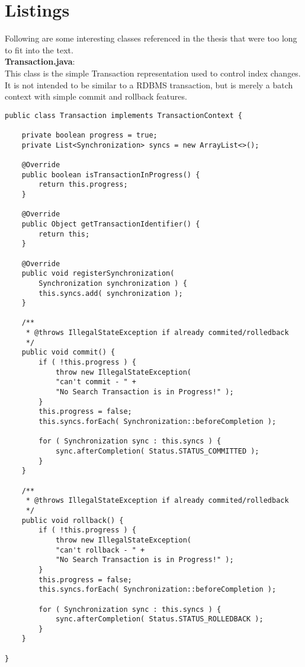\section*{Listings}

Following are some interesting classes referenced in the thesis that were too long to fit into the text.
\\

\noindent
\textbf{Transaction.java}:\\
This class is the simple Transaction representation used to control index changes. It is not intended to be similar to a RDBMS transaction, but is merely a batch context with simple commit and rollback features.
\\
\lstset{language=java}
\begin{lstlisting}[frame=htrbl, caption={the simple Transaction contract}, label={lst:Transaction.java}]
public class Transaction implements TransactionContext {

	private boolean progress = true;
	private List<Synchronization> syncs = new ArrayList<>();
	
	@Override
	public boolean isTransactionInProgress() {
		return this.progress;
	}
	
	@Override
	public Object getTransactionIdentifier() {
		return this;
	}
	
	@Override
	public void registerSynchronization(
		Synchronization synchronization ) {
		this.syncs.add( synchronization );
	}
	
	/**
	 * @throws IllegalStateException if already commited/rolledback
	 */
	public void commit() {
		if ( !this.progress ) {
			throw new IllegalStateException( 
			"can't commit - " + 
			"No Search Transaction is in Progress!" );
		}
		this.progress = false;
		this.syncs.forEach( Synchronization::beforeCompletion );
		
		for ( Synchronization sync : this.syncs ) {
			sync.afterCompletion( Status.STATUS_COMMITTED );
		}
	}
	
	/**
	 * @throws IllegalStateException if already commited/rolledback
 	 */
	public void rollback() {
		if ( !this.progress ) {
			throw new IllegalStateException( 
			"can't rollback - " + 
			"No Search Transaction is in Progress!" );
		}
		this.progress = false;
		this.syncs.forEach( Synchronization::beforeCompletion );
	
		for ( Synchronization sync : this.syncs ) {
			sync.afterCompletion( Status.STATUS_ROLLEDBACK );
		}
	}

}
\end{lstlisting}

